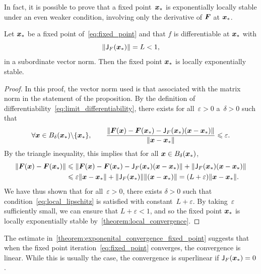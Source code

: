 In fact, it is possible to prove that a fixed point~$\mathbf{\boldsymbol{x}}_*$ is exponentially locally stable under an even weaker condition,
involving only the derivative of $\mathbf{\boldsymbol{F}}$ at $\mathbf{\boldsymbol{x}}_*$.
\begin{proposition}
    \label{proposition:local_convergence}
    Let $\mathbf{\boldsymbol{x}}_*$ be a fixed point of~\eqref{eq:fixed_point} and that $f$ is differentiable at $\mathbf{\boldsymbol{x}}_*$ with
    \[
        \lVert\mathsf J_F(\mathbf{\boldsymbol{x}}_*)\rVert = L < 1,
    \]
    in a subordinate vector norm.
    Then  the fixed point $\mathbf{\boldsymbol{x}}_*$ is locally exponentially stable.
\end{proposition}
\begin{proof}
    In this proof, the vector norm used is that associated with the matrix norm in the statement of the proposition.
    By the definition of differentiability~\eqref{eq:limit_differentiability},
    there exists for all~$\varepsilon > 0$ a~$\delta > 0$ such that
    \[
        \forall \mathbf{\boldsymbol{x}} \in B_{\delta} (\mathbf{\boldsymbol{x}}_*) \backslash \{ \mathbf{\boldsymbol{x}}_* \}, \qquad
        \frac{\lVert\mathbf{\boldsymbol{F}}(\mathbf{\boldsymbol{x}}) - \mathbf{\boldsymbol{F}}(\mathbf{\boldsymbol{x}}_*) - \mathsf J_F(\mathbf{\boldsymbol{x}}_*)(\mathbf{\boldsymbol{x}} - \mathbf{\boldsymbol{x}}_*)\rVert}{\lVert\mathbf{\boldsymbol{x}} - \mathbf{\boldsymbol{x}}_*\rVert} \leqslant \varepsilon.
    \]
    By the triangle inequality,
    this implies that for all $\mathbf{\boldsymbol{x}} \in B_{\delta} (\mathbf{\boldsymbol{x}}_*)$,
    \begin{align*}
        \lVert\mathbf{\boldsymbol{F}}(\mathbf{\boldsymbol{x}}) - \mathbf{\boldsymbol{F}}(\mathbf{\boldsymbol{x}}_*)\rVert
        &\leqslant
        \lVert\mathbf{\boldsymbol{F}}(\mathbf{\boldsymbol{x}}) - \mathbf{\boldsymbol{F}}(\mathbf{\boldsymbol{x}}_*) - \mathsf J_F(\mathbf{\boldsymbol{x}}_*)(\mathbf{\boldsymbol{x}} - \mathbf{\boldsymbol{x}}_*)\rVert + \lVert\mathsf J_F(\mathbf{\boldsymbol{x}}_*)(\mathbf{\boldsymbol{x}} - \mathbf{\boldsymbol{x}}_*)\rVert \\
        &\leqslant
        \varepsilon \lVert\mathbf{\boldsymbol{x}} - \mathbf{\boldsymbol{x}}_*\rVert + \lVert\mathsf J_F(\mathbf{\boldsymbol{x}}_*)\rVert \lVert(\mathbf{\boldsymbol{x}} - \mathbf{\boldsymbol{x}}_*)\rVert
        = (L + \varepsilon) \lVert\mathbf{\boldsymbol{x}} - \mathbf{\boldsymbol{x}}_*\rVert.
    \end{align*}
    We have thus shown that for all~$\varepsilon > 0$,
    there exists $\delta > 0$ such that condition~\eqref{eq:local_lipschitz} is satisfied with constant~$L+\varepsilon$.
    By taking~$\varepsilon$ sufficiently small,
    we can ensure that $L + \varepsilon < 1$,
    and so the fixed point $\mathbf{\boldsymbol{x}}_*$ is locally exponentially stable by~\cref{theorem:local_convergence}.
\end{proof}

The estimate in~\cref{theorem:exponenital_convergence_fixed_point} suggests that
when the fixed point iteration~\eqref{eq:fixed_point} converges,
the convergence is linear.
While this is usually the case,
the convergence is superlinear if $\mathsf J_F(\mathbf{\boldsymbol{x}}_*) = 0$.


